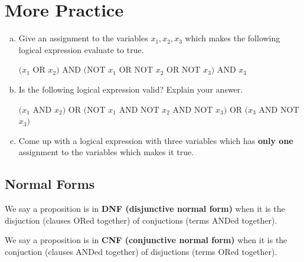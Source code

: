 \documentclass[12pt,letterpaper]{article}
\newif\ifsol
\newcommand{\solu}[2]{ \begin{mdframed} \ifsol #2 \else \vspace{#1} \fi \end{mdframed} }
\begin{document}
	    \section*{More Practice}
	\begin{enumerate}[a.]
		\item Give an assignment to the variables $x_1,x_2,x_3$ which makes the following logical expression evaluate to true.

		$(x_1 $ OR $ x_2)$ AND $ ($NOT $ x_1 $ OR $ $NOT $ x_2 $ OR $ $NOT $ x_3) $ AND $ x_3$
        \begin{mdframed} \vspace{1cm} \end{mdframed}

		\item Is the following logical expression valid? Explain your answer.

		$(x_1 $ AND $ x_2)$ OR $ ($NOT $ x_1 $ AND $ $NOT $ x_2 $ AND $ $NOT $ x_3) $ OR $ (x_3 $ AND $ $NOT $ x_3) $

        \begin{mdframed} \vspace{1cm} \end{mdframed}

		\item Come up with a logical expression with three variables which has \textbf{only one} assignment to the variables which makes it true.

        \begin{mdframed} \vspace{1cm} \end{mdframed}


    \end{enumerate}

    \newpage
	\subsection*{Normal Forms}
	We say a proposition is in \textbf{DNF (disjunctive normal form)} when it is the disjuction (clauses ORed together) of conjuctions (terms ANDed together).
	
	We say a proposition is in \textbf{CNF (conjunctive normal form)} when it is the conjuction (clauses ANDed together) of disjuctions (terms ORed together). 
	
\end{document}
